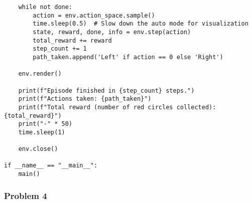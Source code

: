 \begin{lstlisting}
    while not done:
        action = env.action_space.sample()
        time.sleep(0.5)  # Slow down the auto mode for visualization
        state, reward, done, info = env.step(action)
        total_reward += reward
        step_count += 1
        path_taken.append('Left' if action == 0 else 'Right')

    env.render()

    print(f"Episode finished in {step_count} steps.")
    print(f"Actions taken: {path_taken}")
    print(f"Total reward (number of red circles collected): {total_reward}")
    print("-" * 50)
    time.sleep(1)
    
    env.close()

if __name__ == "__main__":
    main()

\end{lstlisting}


\newpage
\clearpage

\subsubsection*{Problem 4}
\label{appendix:G_2023_IMO_Shortlist_C4}



